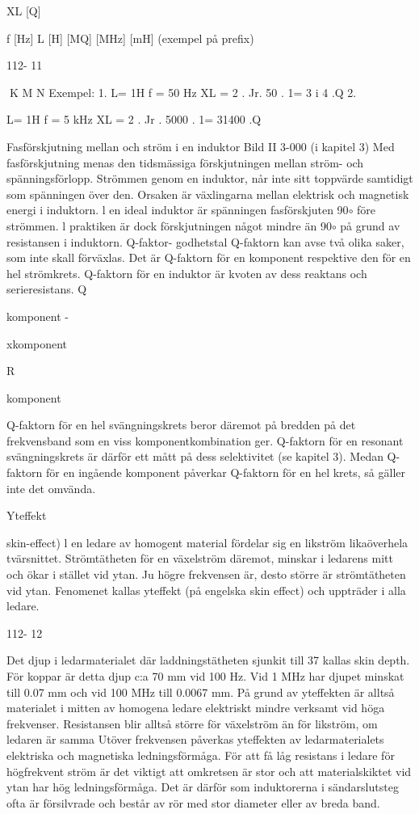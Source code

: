 \documentclass[a4paper,twoside,twocolumn,openright]{book}
\begin{document}
{{XL [Q]

f [Hz] L [H]
[MQ]
[MHz] [mH]
(exempel på prefix)

112- 11

K M N
Exempel:
1.
L= 1H
f = 50 Hz
XL = 2 . Jr. 50 . 1= 3 i 4 .Q
2.

L= 1H
f = 5 kHz
XL = 2 . Jr . 5000 . 1= 31400 .Q

Fasförskjutning mellan
och
ström i en induktor
Bild II 3-000 (i kapitel 3)
Med fasförskjutning menas den tidsmässiga förskjutningen mellan ström- och
spänningsförlopp. Strömmen genom en induktor, når inte sitt toppvärde samtidigt som
spänningen över den. Orsaken är växlingarna mellan elektrisk och magnetisk energi i
induktorn.
l en ideal induktor är spänningen fasförskjuten 90$\circ$ före strömmen. l praktiken är
dock förskjutningen något mindre än 90$\circ$ på
grund av resistansen i induktorn.
Q-faktor- godhetstal
Q-faktorn kan avse två olika saker, som inte
skall förväxlas. Det är Q-faktorn för en komponent respektive den för en hel strömkrets.
Q-faktorn för en induktor är kvoten av
dess reaktans och serieresistans.
Q

komponent -

xkomponent

R

komponent

Q-faktorn för en hel svängningskrets beror däremot på bredden på det frekvensband som en viss komponentkombination
ger. Q-faktorn för en resonant svängningskrets är därför ett mått på dess selektivitet
(se kapitel 3).
Medan Q-faktorn för en ingående komponent påverkar Q-faktorn för en hel krets,
så gäller inte det omvända.

Yteffekt {skin-effect)
l en ledare av homogent material fördelar sig
en likström likaöverhela tvärsnittet. Strömtätheten för en växelström däremot, minskar i
ledarens mitt och ökar i stället vid ytan. Ju
högre frekvensen är, desto större är strömtätheten vid ytan. Fenomenet kallas yteffekt
(på engelska skin effect) och uppträder i alla
ledare.

112- 12

Det djup i ledarmaterialet där laddningstätheten sjunkit till 37%
kallas skin depth. För koppar är detta djup
c:a 70 mm vid 100 Hz. Vid 1 MHz har djupet
minskat till 0.07 mm och vid 100 MHz till
0.0067 mm. På grund av yteffekten är alltså
materialet i mitten av homogena ledare elektriskt mindre verksamt vid höga frekvenser.
Resistansen blir alltså större för växelström
än för likström, om ledaren är samma
Utöver frekvensen påverkas yteffekten
av ledarmaterialets elektriska och magnetiska ledningsförmåga. För att få låg resistans
i ledare för högfrekvent ström är det viktigt att
omkretsen är stor och att materialskiktet vid
ytan har hög ledningsförmåga. Det är därför
som induktorerna i sändarslutsteg ofta är
försilvrade och består av rör med stor diameter eller av breda band.

}}}
\end{document}
